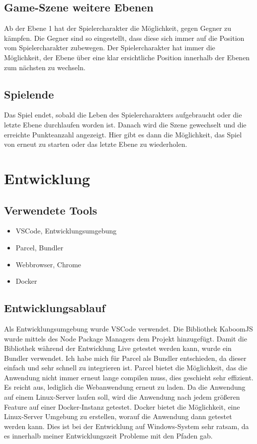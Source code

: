 \documentclass[12pt,a4paper]{article}
\begin{document}
\newpage

\subsection{Game-Szene weitere Ebenen}
Ab der Ebene 1 hat der Spielercharakter die Möglichkeit, gegen Gegner zu kämpfen. Die Gegner sind so eingestellt, dass diese sich immer auf die Position vom Spielercharakter zubewegen. Der Spielercharakter hat immer die Möglichkeit, der Ebene über eine klar ersichtliche Position innerhalb der Ebenen zum nächsten zu wechseln.

\subsection{Spielende}
Das Spiel endet, sobald die Leben des Spielercharakters aufgebraucht oder die letzte Ebene durchlaufen worden ist. Danach wird die Szene gewechselt und die erreichte Punkteanzahl angezeigt. Hier gibt es dann die Möglichkeit, das Spiel von erneut zu starten oder das letzte Ebene zu wiederholen.


\section{Entwicklung}
\subsection{Verwendete Tools}
\begin{itemize}
    \item VSCode, Entwicklungsumgebung
    \item Parcel, Bundler
    \item Webbrowser, Chrome
    \item Docker
\end{itemize}
\subsection{Entwicklungsablauf}
Als Entwicklungsumgebung wurde VSCode verwendet. Die Bibliothek KaboomJS wurde mittels des Node Package Managers dem Projekt hinzugefügt. Damit die Bibliothek während der Entwicklung Live getestet werden kann, wurde ein Bundler verwendet. Ich habe mich für Parcel als Bundler entschieden, da dieser einfach und sehr schnell zu integrieren ist. Parcel bietet die Möglichkeit, das die Anwendung nicht immer erneut lange compilen muss, dies geschieht sehr effizient. Es reicht aus, lediglich die Webanwendung erneut zu laden. Da die Anwendung auf einem Linux-Server laufen soll, wird die Anwendung nach jedem größeren Feature auf einer Docker-Instanz getestet. Docker bietet die Möglichkeit, eine Linux-Server Umgebung zu erstellen, worauf die Anwendung dann getestet werden kann. Dies ist bei der Entwicklung auf Windows-System sehr ratsam, da es innerhalb meiner Entwicklungszeit Probleme mit den Pfaden gab.
\end{document}
